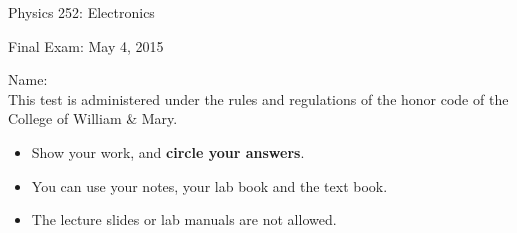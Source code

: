 \documentclass[letterpaper,addpoints]{exam}
\begin{document}
\begin{coverpages}
 \large\bfseries
 
 \noindent 
 Physics 252: Electronics
 
 \vspace{2ex}
 \noindent
 Final Exam: May 4, 2015

 \vspace{5ex}
 \noindent 
 Name:\enspace\makebox[2in]{\hrulefill}\\

 \vspace{5ex}
 \noindent 
 This test is administered under the rules and regulations of the honor 
 code of the College of William \& Mary.  

 \vspace{5ex}
 \noindent 
 \begin{itemize}
  \item Show your work, and \textbf{circle your answers}.
  \item You can use your notes, your lab book and the text book.
  \item The lecture slides or lab manuals are not allowed.
 \end{itemize}

 \vspace{5ex}
 \begin{center}
  \gradetable[v][questions]
 \end{center}
\end{coverpages}
 
\end{document}
